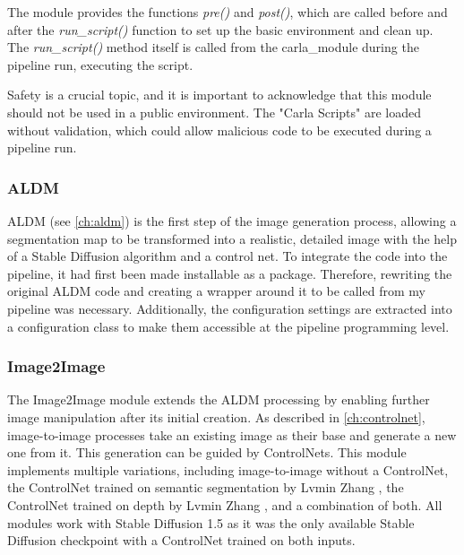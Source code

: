The module provides the functions \textit{pre()} and \textit{post()}, which are called before and after the \textit{run\_script()} function to set up the basic environment and clean up. The \textit{run\_script()} method itself is called from the carla\_module during the pipeline run, executing the script. 

Safety is a crucial topic, and it is important to acknowledge that this module should not be used in a public environment. The "Carla Scripts" are loaded without validation, which could allow malicious code to be executed during a pipeline run.

\subsubsection{ALDM}

ALDM (see \autoref{ch:aldm}) is the first step of the image generation process, allowing a segmentation map to be transformed into a realistic, detailed image with the help of a Stable Diffusion algorithm and a control net. To integrate the code into the pipeline, it had first been made installable as a package. Therefore, rewriting the original ALDM code and creating a wrapper around it to be called from my pipeline was necessary. Additionally, the configuration settings are extracted into a configuration class to make them accessible at the pipeline programming level.

\subsubsection{Image2Image}

The Image2Image module extends the ALDM processing by enabling further image manipulation after its initial creation. As described in \autoref{ch:controlnet}, image-to-image processes take an existing image as their base and generate a new one from it. This generation can be guided by ControlNets. This module implements multiple variations, including image-to-image without a ControlNet, the ControlNet trained on semantic segmentation by Lvmin Zhang \cite{zhang2023addingconditionalcontroltexttoimage}, the ControlNet trained on depth by Lvmin Zhang \cite{zhang2023addingconditionalcontroltexttoimage}, and a combination of both. All modules work with Stable Diffusion 1.5 \cite{rombach2022highresolution} as it was the only available Stable Diffusion checkpoint with a ControlNet trained on both inputs.

